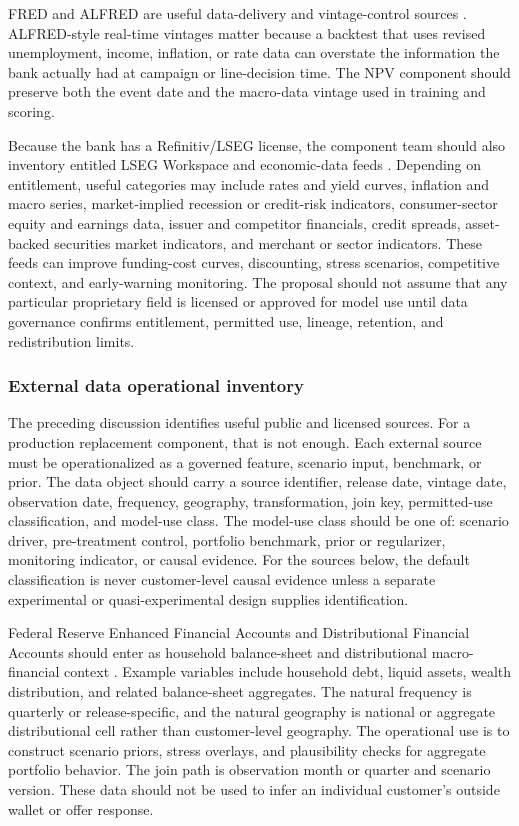\documentclass[11pt]{article}
\newcommand{\1}{\mathbf{1}}
\begin{document}
FRED and ALFRED are useful data-delivery and vintage-control sources
\citep{fredALFRED}. ALFRED-style real-time vintages matter because a backtest
that uses revised unemployment, income, inflation, or rate data can overstate
the information the bank actually had at campaign or line-decision time. The
NPV component should preserve both the event date and the macro-data vintage
used in training and scoring.

Because the bank has a Refinitiv/LSEG license, the component team should also
inventory entitled LSEG Workspace and economic-data feeds
\citep{lsegWorkspace,lsegEconomicData}. Depending on entitlement, useful
categories may include rates and yield curves, inflation and macro series,
market-implied recession or credit-risk indicators, consumer-sector equity and
earnings data, issuer and competitor financials, credit spreads, asset-backed
securities market indicators, and merchant or sector indicators. These feeds
can improve funding-cost curves, discounting, stress scenarios, competitive
context, and early-warning monitoring. The proposal should not assume that any
particular proprietary field is licensed or approved for model use until data
governance confirms entitlement, permitted use, lineage, retention, and
redistribution limits.

\subsubsection{External data operational inventory}
\label{subsec:external-data-operational-inventory}

The preceding discussion identifies useful public and licensed sources. For a
production replacement component, that is not enough. Each external source must
be operationalized as a governed feature, scenario input, benchmark, or prior.
The data object should carry a source identifier, release date, vintage date,
observation date, frequency, geography, transformation, join key, permitted-use
classification, and model-use class. The model-use class should be one of:
scenario driver, pre-treatment control, portfolio benchmark, prior or
regularizer, monitoring indicator, or causal evidence. For the sources below,
the default classification is never customer-level causal evidence unless a
separate experimental or quasi-experimental design supplies identification.

Federal Reserve Enhanced Financial Accounts and Distributional Financial
Accounts should enter as household balance-sheet and distributional
macro-financial context \citep{federalreserveEFA}. Example variables include
household debt, liquid assets, wealth distribution, and related balance-sheet
aggregates. The natural frequency is quarterly or release-specific, and the
natural geography is national or aggregate distributional cell rather than
customer-level geography. The operational use is to construct scenario priors,
stress overlays, and plausibility checks for aggregate portfolio behavior. The
join path is observation month or quarter and scenario version. These data
should not be used to infer an individual customer's outside wallet or offer
response.
\end{document}

